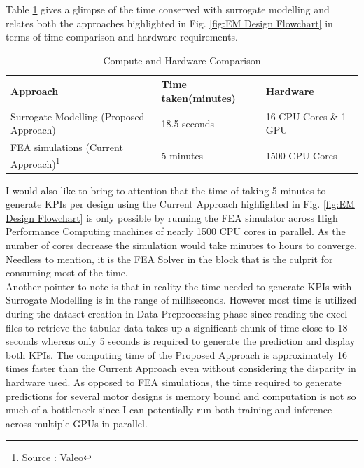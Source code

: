 \documentclass{report} %
\begin{document}
Table \ref{tab:Compute Time Comparisions} gives a glimpse of the time conserved with surrogate modelling and relates both the approaches highlighted in Fig. 
\ref{fig:EM Design Flowchart} in terms of time comparison and hardware requirements.

\begin{minipage}[t]{\textwidth}
    \begin{table}[H]
        \centering
        \begin{tabular}{|p{}|p{}|p{}|}
        \hline {\bf Approach} & {\bf Time taken(minutes)} & {\bf Hardware}\\
        \hline 
        Surrogate Modelling (Proposed Approach) & 18.5 seconds & 16 CPU Cores \& 1 GPU\\
        \ac{FEA} simulations (Current Approach)\footnote{Source : Valeo} & 5 minutes & 1500 CPU Cores\\
        \hline
        \end{tabular}
        \caption{Compute and Hardware Comparison}
        \label{tab:Compute Time Comparisions}
    \end{table}
\end{minipage}

\vspace{1em} 

I would also like to bring to attention that the time of taking 5 minutes to generate \ac{KPI}s per design using the Current Approach highlighted in Fig. 
\ref{fig:EM Design Flowchart} is only possible by running the \ac{FEA} simulator across High Performance Computing machines of nearly 1500 CPU cores in parallel. 
As the number of cores decrease the simulation would take minutes to hours to converge. Needless to mention, it is the \ac{FEA} Solver in the block that is the culprit for 
consuming most of the time. \\

Another pointer to note is that in reality the time needed to generate \ac{KPI}s with Surrogate Modelling is in the range of milliseconds. 
However most time is utilized during the dataset creation in Data Preprocessing phase since reading the excel files to retrieve the tabular data takes up a 
significant chunk of time close to 18 seconds whereas only 5 seconds is required to generate the prediction and display both \ac{KPI}s.
The computing time of the Proposed Approach is approximately 16 times faster than the Current Approach even without considering the disparity in hardware used.
As opposed to \ac{FEA} simulations, the time required to generate predictions for several motor designs is memory bound 
and computation is not so much of a bottleneck since I can potentially run both training and inference across multiple GPUs in parallel.\\
\end{document}
